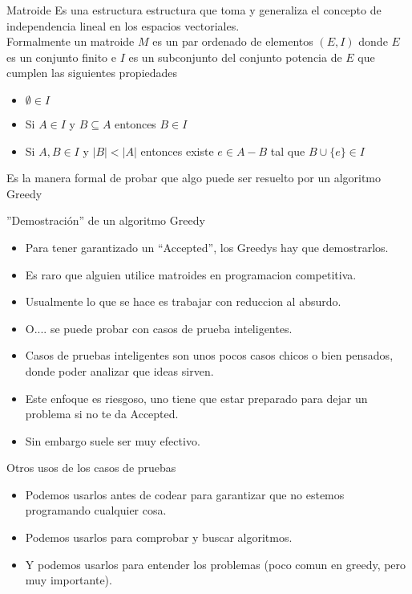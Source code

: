 \documentclass{beamer}
\begin{document}
\begin{frame}{Matroide}
  Es una estructura  estructura que toma y generaliza el concepto de
  independencia lineal en los espacios vectoriales.\\\pause
  Formalmente un matroide $M$ es un par ordenado de elementos $(E,I)$ 
  donde $E$ es un conjunto finito e $I$ es un subconjunto del conjunto
  potencia de $E$ que cumplen las siguientes propiedades
  \begin{itemize}
  \item $\emptyset \in I$
  \item Si $A \in I$ y $B \subseteq A$ entonces $B \in I$
  \item Si $A, B \in I$ y $|B| < |A|$ entonces existe $e\in A - B$ 
    tal que $B\cup \{e\}\in I$ 
  \end{itemize}\pause
  Es la manera formal de probar que algo puede ser resuelto por un algoritmo Greedy 
\end{frame}

\begin{frame}{''Demostración'' de un algoritmo Greedy}
  \begin{itemize}
    \item Para tener garantizado un “Accepted”, los Greedys hay que
      demostrarlos.
    \item Es raro que alguien utilice matroides en programacion competitiva.
    \item Usualmente lo que se hace es trabajar con reduccion al absurdo. 
    \item O.... se puede probar con casos de prueba inteligentes.
    \item Casos de pruebas inteligentes son unos pocos casos chicos o
      bien pensados, donde poder analizar que ideas sirven.
    \item Este enfoque es riesgoso, uno tiene que estar preparado para
      dejar un problema si no te da Accepted.
    \item Sin embargo suele ser muy efectivo.
  \end{itemize}
\end{frame}

\begin{frame}{Otros usos de los casos de pruebas}
  \begin{itemize}
    \item Podemos usarlos antes de codear para garantizar que no
      estemos programando cualquier cosa.
    \item Podemos usarlos para comprobar y buscar algoritmos.
    \item Y podemos usarlos para entender los problemas 
      (poco comun en greedy, pero muy importante).
  \end{itemize}
\end{frame}
\end{document}
